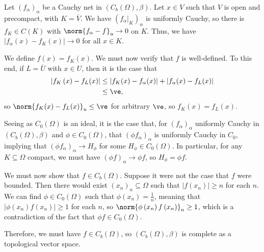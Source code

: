 \documentclass[10pt]{mypackage}
\begin{document}
\begin{solution}[]
  Let $\left(f_{\alpha}\right)_{\alpha}$ be a Cauchy net in $\left(C_b\left(\Omega\right),\beta\right)$. Let $x\in V$ such that $V$ is open and precompact, with $K = \overline{V}$. We have $\left(f_{\alpha}|_{K}\right)_{\alpha}$ is uniformly Cauchy, so there is $f_{K}\in C\left(K\right)$ with $\norm{f_{\alpha}-f}_{u}\rightarrow 0$ on $K$. Thus, we have $\left\vert f_{\alpha}(x) - f_{K}(x) \right\vert \rightarrow 0$ for all $x\in K$.\newline

  We define $f(x) = f_K(x)$. We must now verify that $f$ is well-defined. To this end, if $L = \overline{U}$ with $x\in U$, then it is the case that
  \begin{align*}
    \left\vert f_{K}\left(x\right) -  f_{L}(x) \right\vert &\leq \left\vert f_{K}(x) - f_{\alpha}(x)  \right\vert + \left\vert f_{\alpha}(x) - f_{L}(x) \right\vert\\
                                                           &\leq \ve,
  \end{align*}
  so $\norm{f_{K}(x) - f_{L}(x)}_{u} \leq \ve$ for arbitrary $\ve$, so $f_K(x) = f_L(x)$.\newline

  Seeing as $C_0(\Omega)$ is an ideal, it is the case that, for $\left(f_{\alpha}\right)_{\alpha}$ uniformly Cauchy in $\left(C_b\left(\Omega\right),\beta\right)$ and $\phi\in C_0\left(\Omega\right)$, that $\left(\phi f_{\alpha}\right)_{\alpha}$ is uniformly Cauchy in $C_0$, implying that $\left(\phi f_{\alpha}\right)_{\alpha}\rightarrow H_{\phi}$ for some $H_{\phi}\in C_0\left(\Omega\right)$. In particular, for any $K\subseteq \Omega$ compact, we must have $\left(\phi f\right)_{\alpha}\rightarrow \phi f$, so $H_{\phi} = \phi f$.\newline

  We must now show that $f\in C_b\left(\Omega\right)$. Suppose it were not the case that $f$ were bounded. Then there would exist $\left(x_n\right)_n\subseteq \Omega$ such that $\left\vert f\left(x_n\right) \right\vert \geq n$ for each $n$. We can find $\phi\in C_0\left(\Omega\right)$ such that $\phi\left(x_n\right)  = \frac{1}{n}$, meaning that $\left\vert \phi\left(x_n\right)f\left(x_n\right) \right\vert \geq 1$ for each $n$, so $\norm{\phi\left(x_n\right)f\left(x_n\right)}_{n} \geq 1$, which is a contradiction of the fact that $\phi f\in C_0\left(\Omega\right)$.\newline

  Therefore, we must have $f\in C_b\left(\Omega\right)$, so $\left(C_b\left(\Omega\right),\beta\right)$ is complete as a topological vector space.
\end{solution}
\end{document}
